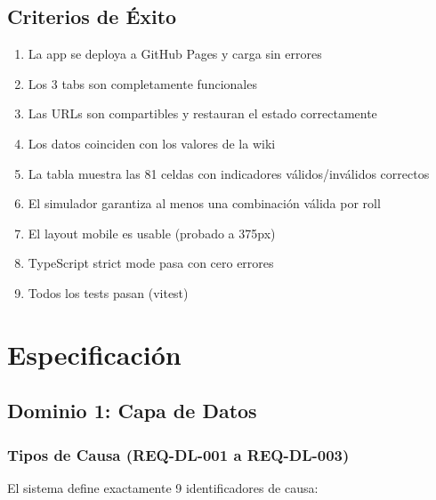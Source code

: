 \documentclass[11pt,a4paper]{report}
\begin{document}
\section{Criterios de Éxito}

\begin{enumerate}
  \item La app se deploya a GitHub Pages y carga sin errores
  \item Los 3 tabs son completamente funcionales
  \item Las URLs son compartibles y restauran el estado correctamente
  \item Los datos coinciden con los valores de la wiki
  \item La tabla muestra las 81 celdas con indicadores válidos/inválidos correctos
  \item El simulador garantiza al menos una combinación válida por roll
  \item El layout mobile es usable (probado a 375px)
  \item TypeScript strict mode pasa con cero errores
  \item Todos los tests pasan (vitest)
\end{enumerate}

\cleardoublepage

\chapter{Especificación}

\section{Dominio 1: Capa de Datos}

\subsection{Tipos de Causa (REQ-DL-001 a REQ-DL-003)}

El sistema define exactamente 9 identificadores de causa:
\end{document}
